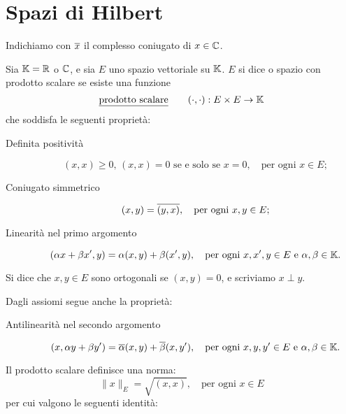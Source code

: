 \chapter{Spazi di Hilbert}
Indichiamo con $\overline{x}$ il complesso coniugato di $x \in \mathbb{C}$.

\begin{definition}
	Sia $\mathbb{K} = \mathbb{R}$ o $\mathbb{C}$, e sia $E$ uno spazio vettoriale su $\mathbb{K}$. $E$ si dice  o spazio con prodotto scalare se esiste una funzione
	\begin{equation*}
		\text{\underline{prodotto scalare}} \qquad (\cdot,\cdot) : E \times E \to \mathbb{K}
	\end{equation*}
	che soddisfa le seguenti proprietà:
	\begin{description}
		\item[Definita positività]
		\begin{equation*}
			\text{$(x,x) \geq 0$, $(x,x) = 0$ se e solo se $x=0$}, \quad \text{per ogni $x \in E$};
		\end{equation*}
		\item[Coniugato simmetrico]
		\begin{equation*}
			\text{$(x,y) = \overline{(y,x)}$}, \quad \text{per ogni $x,y \in E$};
		\end{equation*}
		\item[Linearità nel primo argomento]
		\begin{equation*}
			\text{$(\alpha x+ \beta x', y) = \alpha (x,y) + \beta (x',y)$}, \quad \text{per ogni $x,x',y \in E$ e $\alpha,\beta \in \mathbb{K}$.}
		\end{equation*}
	\end{description}
	Si dice che $x,y \in E$ sono ortogonali se $(x,y) = 0$, e scriviamo $x \perp y$.
\end{definition}

\begin{remark}
	Dagli assiomi segue anche la proprietà:
	\begin{description}
		\item[Antilinearità nel secondo argomento]
		\begin{equation*}
			\text{$(x, \alpha y + \beta y') = \overline{\alpha} (x,y) + \overline{\beta} (x,y')$}, \quad \text{per ogni $x,y,y' \in E$ e $\alpha,\beta \in \mathbb{K}$}.
		\end{equation*}
	\end{description}
\end{remark}

Il prodotto scalare definisce una norma:
\begin{equation*}
	\|x\|_E = \sqrt{(x,x)}, \quad \text{per ogni $x \in E$}
\end{equation*}
per cui valgono le seguenti identità:

